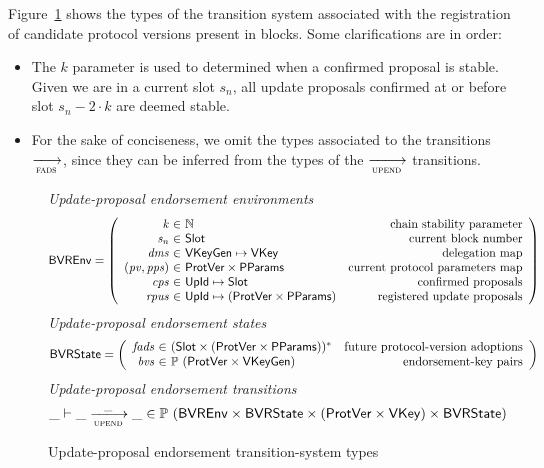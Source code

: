 Figure~\ref{fig:ts-types:up-end} shows the types of the transition system
associated with the registration of candidate protocol versions present in
blocks. Some clarifications are in order:
\begin{itemize}
\item The $k$ parameter is used to determined when a confirmed proposal is
  stable. Given we are in a current slot $s_n$, all update proposals confirmed
  at or before slot $s_n - 2 \cdot k$ are deemed stable.
\item For the sake of conciseness, we omit the types associated to the
  transitions $\trans{fads}{}$, since they can be inferred from the types of
  the $\trans{upend}{}$ transitions.
\end{itemize}

\begin{figure}[htb]
  \emph{Update-proposal endorsement environments}
  \begin{align*}
    & \BVREnv
      = \left(
      \begin{array}{r@{~\in~}lr}
        \var{k} & \mathbb{N} & \text{chain stability parameter}\\
        \var{s_n} & \Slot & \text{current block number}\\
        \var{dms} & \VKeyGen \mapsto \VKey & \text{delegation map}\\
        (\var{pv}, \var{pps}) & \ProtVer \times \PPMMap
                             & \text{current protocol parameters map}\\
        \var{cps} & \UPropId \mapsto \Slot & \text{confirmed proposals}\\
        \var{rpus} & \UPropId \mapsto (\ProtVer \times \PPMMap)
                             & \text{registered update proposals}\\
      \end{array}\right)
  \end{align*}
  \emph{Update-proposal endorsement states}
  \begin{align*}
    & \BVRState
      = \left(
      \begin{array}{r@{~\in~}lr}
        \var{fads} & \seqof{(\Slot \times (\ProtVer \times \PPMMap))}
        & \text{future protocol-version adoptions}\\
        \var{bvs} & \powerset{(\ProtVer \times \VKeyGen)}
        & \text{endorsement-key pairs}
      \end{array}\right)
  \end{align*}
  \emph{Update-proposal endorsement transitions}
    \begin{equation*}
    \_ \vdash \_ \trans{upend}{\_} \_ \in
    \powerset (\BVREnv \times \BVRState
    \times (\ProtVer \times \VKey) \times \BVRState)
    \end{equation*}
  \caption{Update-proposal endorsement transition-system types}
  \label{fig:ts-types:up-end}
\end{figure}

